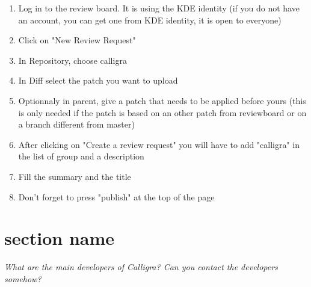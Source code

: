 \documentclass[11pt]{scrartcl}
\begin{document}
\begin{enumerate}
	\item Log in to the review board. It is using the KDE identity (if you do not have an account, you can get one from KDE identity, it is open to everyone)
	\item Click on "New Review Request"
	\item In Repository, choose calligra
	\item In Diff select the patch you want to upload
	\item Optionnaly in parent, give a patch that needs to be applied before yours (this is only needed if the patch is based on an other patch from reviewboard or on a branch different from master)
	\item After clicking on "Create a review request" you will have to add "calligra" in the list of group and a description
	\item Fill the summary and the title
	\item Don't forget to press "publish" at the top of the page
\end{enumerate}

\section{section name}
\label{sec:}


\emph{What are the main developers of Calligra? Can you contact the developers somehow?}

\end{document}
